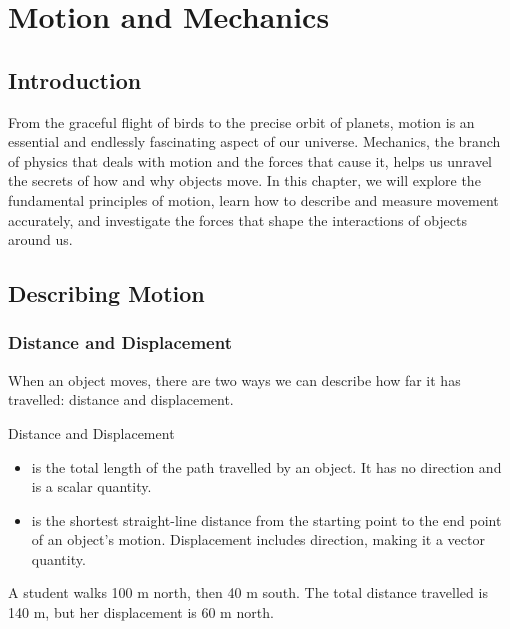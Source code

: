 \chapter{Motion and Mechanics}

\section{Introduction}

From the graceful flight of birds to the precise orbit of planets, motion is an essential and endlessly fascinating aspect of our universe. Mechanics, the branch of physics that deals with motion and the forces that cause it, helps us unravel the secrets of how and why objects move. In this chapter, we will explore the fundamental principles of motion, learn how to describe and measure movement accurately, and investigate the forces that shape the interactions of objects around us.


\section{Describing Motion}

\subsection{Distance and Displacement}

When an object moves, there are two ways we can describe how far it has travelled: distance and displacement.

\begin{keyconcept}{Distance and Displacement}
\begin{itemize}
    \item {} is the total length of the path travelled by an object. It has no direction and is a scalar quantity.
    \item {} is the shortest straight-line distance from the starting point to the end point of an object's motion. Displacement includes direction, making it a vector quantity.
\end{itemize}
\end{keyconcept}

\begin{example}
A student walks 100 m north, then 40 m south. The total distance travelled is 140 m, but her displacement is 60 m north.
\end{example}

